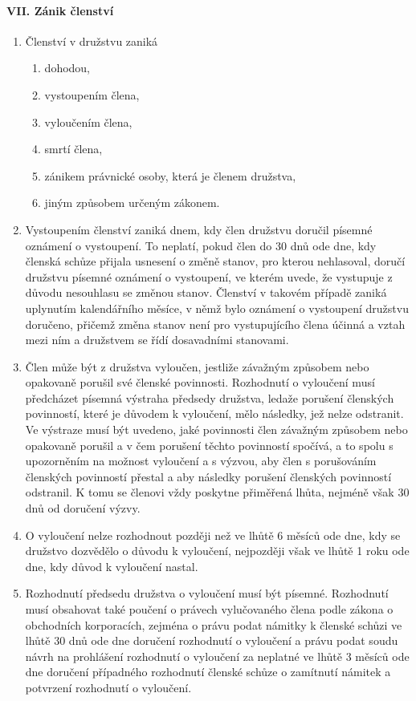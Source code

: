 \paragraph{VII. Zánik členství}
\begin{enumerate}
    \item Členství v družstvu zaniká
    \begin{enumerate}[label=\alph*.]
        \item dohodou,
        \item vystoupením člena,
        \item vyloučením člena,
        \item smrtí člena,
        \item zánikem právnické osoby, která je členem družstva,
        \item jiným způsobem určeným zákonem.
    \end{enumerate}
    \item Vystoupením členství zaniká dnem, kdy člen družstvu doručil písemné oznámení o vystoupení. To neplatí, pokud člen do 30 dnů ode dne, kdy členská schůze přijala usnesení o změně stanov, pro kterou nehlasoval, doručí družstvu písemné oznámení o vystoupení, ve kterém uvede, že vystupuje z důvodu nesouhlasu se změnou stanov. Členství v takovém případě zaniká uplynutím kalendářního měsíce, v němž bylo oznámení o vystoupení družstvu doručeno, přičemž změna stanov není pro vystupujícího člena účinná a vztah mezi ním a družstvem se řídí dosavadními stanovami.
    \item Člen může být z družstva vyloučen, jestliže závažným způsobem nebo opakovaně porušil své členské povinnosti. Rozhodnutí o vyloučení musí předcházet písemná výstraha předsedy družstva, ledaže porušení členských povinností, které je důvodem k vyloučení, mělo následky, jež nelze odstranit. Ve výstraze musí být uvedeno, jaké povinnosti člen závažným způsobem nebo opakovaně porušil a v čem porušení těchto povinností spočívá, a to spolu s upozorněním na možnost vyloučení a s výzvou, aby člen s porušováním členských povinností přestal a aby následky porušení členských povinností odstranil. K tomu se členovi vždy poskytne přiměřená lhůta, nejméně však 30 dnů od doručení výzvy.
    \item O vyloučení nelze rozhodnout později než ve lhůtě 6 měsíců ode dne, kdy se družstvo dozvědělo o důvodu k vyloučení, nejpozději však ve lhůtě 1 roku ode dne, kdy důvod k vyloučení nastal.
    \item Rozhodnutí předsedu družstva o vyloučení musí být písemné. Rozhodnutí musí obsahovat také poučení o právech vylučovaného člena podle zákona o obchodních korporacích, zejména o právu podat námitky k členské schůzi ve lhůtě 30 dnů ode dne doručení rozhodnutí o vyloučení a právu podat soudu návrh na prohlášení rozhodnutí o vyloučení za neplatné ve lhůtě 3 měsíců ode dne doručení případného rozhodnutí členské schůze o zamítnutí námitek a potvrzení rozhodnutí o vyloučení.

\end{enumerate}

